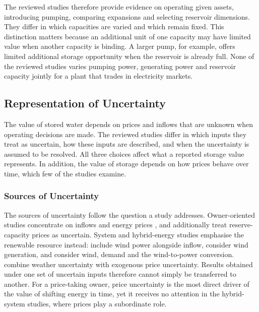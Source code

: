 The reviewed studies therefore provide evidence on operating given
assets, introducing pumping, comparing expansions and selecting
reservoir dimensions. They differ in which capacities are varied and
which remain fixed. This distinction matters because an additional unit
of one capacity may have limited value when another capacity is
binding. A larger pump, for example, offers limited additional storage
opportunity when the reservoir is already full. None of the reviewed
studies varies pumping power, generating power and reservoir capacity
jointly for a plant that trades in electricity markets.

\subsection{Representation of Uncertainty}
\label{sec:lit_uncertainty}

The value of stored water depends on prices and inflows that are unknown
when operating decisions are made. The reviewed studies differ in which
inputs they treat as uncertain, how these inputs are described, and when
the uncertainty is assumed to be resolved. All three choices affect what
a reported storage value represents. In addition, the value of storage
depends on how prices behave over time, which few of the studies
examine.

\subsubsection{Sources of Uncertainty}

The sources of uncertainty follow the question a study addresses.
Owner-oriented studies concentrate on inflows and energy prices
\citep{alic2023optimal,bore2026assessing}, and \citet{helseth2016}
additionally treat reserve-capacity prices as uncertain. System and
hybrid-energy studies emphasise the renewable resource instead:
\citet{helseth2013} include wind power alongside inflow,
\citet{naval2025optimization} consider wind generation, and
\citet{zisos2023mixing} consider wind, demand and the wind-to-power
conversion. \citet{helseth2017} combine weather uncertainty with
exogenous price uncertainty. Results obtained under one set of uncertain
inputs therefore cannot simply be transferred to another. For a
price-taking owner, price uncertainty is the most direct driver of the
value of shifting energy in time, yet it receives no attention in the
hybrid-system studies, where prices play a subordinate role.

